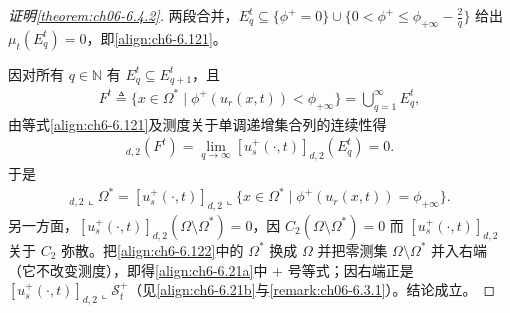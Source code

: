 \documentclass[../../main.tex]{subfiles}%
\begin{document}
\begin{proof}[证明\cref{theorem:ch06-6.4.2}]
两段合并，$E^t_q\subseteq\{\phi^+=0\}\cup\{0<\phi^+\leqslant\phi_{+\infty}-\frac{2}{q}\}$ 给出 $\mu_t(E^t_q)=0$，即\eqref{align:ch6-6.121}。

因对所有 $q\in\mathbb{N}$ 有 $E^t_q\subseteq E^t_{q+1}$，且
\begin{align*}
F^t\triangleq \{x\in\Omega^*\mid\phi^+(u_r(x,t))<\phi_{+\infty}\}=\bigcup_{q=1}^\infty E^t_q,
\end{align*}
由等式\eqref{align:ch6-6.121}及测度关于单调递增集合列的连续性得
\begin{align*}
[u^+_s(\cdot,t)]_{d,2}(F^t)=\lim_{q\to\infty}[u^+_s(\cdot,t)]_{d,2}(E^t_q)=0.
\end{align*}
于是
\begin{align}
[u^+_s(\cdot,t)]_{d,2}\llcorner\Omega^*
=[u^+_s(\cdot,t)]_{d,2}\llcorner\{x\in\Omega^*\mid\phi^+(u_r(x,t))=\phi_{+\infty}\}. \label{align:ch6-6.122}
\end{align}
另一方面，$[u^+_s(\cdot,t)]_{d,2}(\Omega\setminus\Omega^*)=0$，因 $C_2(\Omega\setminus\Omega^*)=0$ 而 $[u^+_s(\cdot,t)]_{d,2}$ 关于 $C_2$ 弥散。把\eqref{align:ch6-6.122}中的 $\Omega^*$ 换成 $\Omega$ 并把零测集 $\Omega\setminus\Omega^*$ 并入右端（它不改变测度），即得\eqref{align:ch6-6.21a}中 $+$ 号等式；因右端正是 $[u^+_s(\cdot,t)]_{d,2}\llcorner\mathscr{S}^+_t$（见\eqref{align:ch6-6.21b}与\cref{remark:ch06-6.3.1}）。结论成立。
\end{proof}
\end{document}
